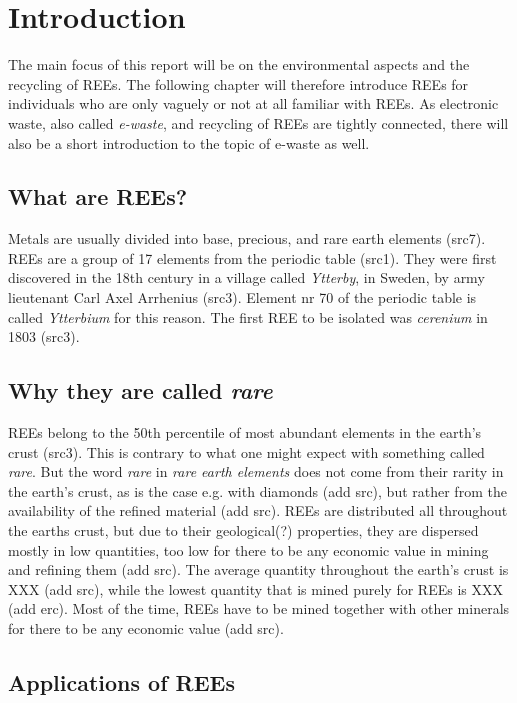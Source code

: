 
\section{Introduction}
The main focus of this report will be on the environmental aspects and the recycling of REEs. The following chapter will therefore introduce REEs for individuals who are only vaguely or not at all familiar with REEs. As electronic waste, also called \textit{e-waste}, and recycling of REEs are tightly connected, there will also be a short introduction to the topic of e-waste as well. 

\subsection{What are REEs?}

Metals are usually divided into base, precious, and rare earth elements (src7). REEs are a group of 17 elements from the periodic table (src1). They were first discovered in the 18th century in a village called \textit{Ytterby}, in Sweden, by army lieutenant Carl Axel Arrhenius (src3). Element nr 70 of the periodic table is called \textit{Ytterbium} for this reason. The first REE to be isolated was \textit{cerenium} in 1803 (src3).  

\subsection{Why they are called \textit{rare}}

REEs belong to the 50th percentile of most abundant elements in the earth's crust (src3). This is contrary to what one might expect with something called \textit{rare}. But the word \textit{rare} in \textit{rare earth elements} does not come from their rarity in the earth's crust, as is the case e.g. with diamonds (add src), but rather from the availability of the refined material (add src).  REEs are distributed all throughout the earths crust, but due to their geological(?) properties, they are dispersed mostly in low quantities, too low for there to be any economic value in mining and refining them (add src). The average quantity throughout the earth's crust is XXX (add src), while the lowest quantity that is mined purely for REEs is XXX (add erc). Most of the time, REEs have to be mined together with other minerals for there to be any economic value (add src). 

\subsection{Applications of REEs}

